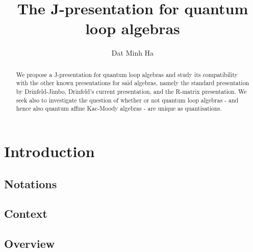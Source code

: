 

\setcounter{section}{-1}





    \title{The J-presentation for quantum loop algebras}
    
    \author{Dat Minh Ha}
    \maketitle
    
    \begin{abstract}
        We propose a J-presentation for quantum loop algebras and study its compatibility with the other known presentations for said algebras, namely the standard presentation by Drinfeld-Jimbo, Drinfeld's current presentation, and the R-matrix presentation. We seek also to investigate the question of whether or not quantum loop algebras - and hence also quantum affine Kac-Moody algebras - are unique as quantisations.
    \end{abstract}
    
    {
    \hypersetup{} 
    \tableofcontents %
    }

    \section{Introduction}
        \subsection{Notations}

        \subsection{Context}
    
        \subsection{Overview}

    

    
    
    \printbibliography

